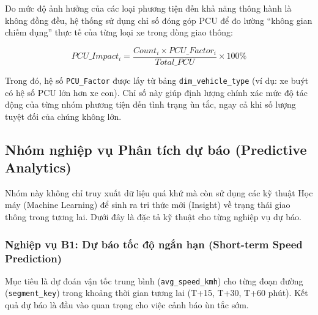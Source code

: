 Do mức độ ảnh hưởng của các loại phương tiện đến khả năng thông hành là không đồng đều, hệ thống sử dụng chỉ số đóng góp PCU để đo lường ``không gian chiếm dụng'' thực tế của từng loại xe trong dòng giao thông:

\[
PCU\_Impact_i =
\frac{Count_i \times PCU\_Factor_i}
{Total\_PCU}
\times 100\%
\]

Trong đó, hệ số \texttt{PCU\_Factor} được lấy từ bảng \texttt{dim\_vehicle\_type} (ví dụ: xe buýt có hệ số PCU lớn hơn xe con). Chỉ số này giúp định lượng chính xác mức độ tác động của từng nhóm phương tiện đến tình trạng ùn tắc, ngay cả khi số lượng tuyệt đối của chúng không lớn.


\subsection{Nhóm nghiệp vụ Phân tích dự báo (Predictive Analytics)}

Nhóm này không chỉ truy xuất dữ liệu quá khứ mà còn sử dụng các kỹ thuật Học máy (Machine Learning) để sinh ra tri thức mới (Insight) về trạng thái giao thông trong tương lai. Dưới đây là đặc tả kỹ thuật cho từng nghiệp vụ dự báo.

\subsubsection{Nghiệp vụ B1: Dự báo tốc độ ngắn hạn (Short-term Speed Prediction)}
Mục tiêu là dự đoán vận tốc trung bình (\verb|avg_speed_kmh|) cho từng đoạn đường (\verb|segment_key|) trong khoảng thời gian tương lai (T+15, T+30, T+60 phút). Kết quả dự báo là đầu vào quan trọng cho việc cảnh báo ùn tắc sớm.

